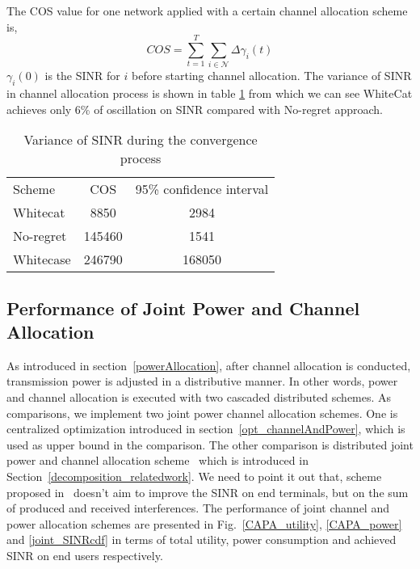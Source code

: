 The COS value for one network applied with a certain channel allocation scheme is,
\begin{equation}
\label{cos}
			COS = \sum\limits_{t=1}^T   \sum\limits_{i\in \mathcal{N}} \varDelta  \gamma_i(t)
			\end{equation}
$\gamma_i(0)$ is the SINR for $i$ before starting channel allocation.
The variance of SINR in channel allocation process is shown in table \ref{costable} from which we can see WhiteCat achieves only 6\% of oscillation on SINR compared with No-regret approach.
\begin{table}[!h]
\centering
\begin{tabular}{|l|c|c|}
  \hline
  Scheme			 						& COS 					& 95\% confidence interval\\
    \hhline{|=|=|=|}
  Whitecat									& 8850					& 2984\\\hline
  No-regret									& 145460				& 1541\\\hline
  Whitecase 								& 246790 				& 168050\\ 
  \hline
\end{tabular}
\caption{Variance of SINR during the convergence process}
\label{costable}
\end{table}



\subsection{Performance of Joint Power and Channel Allocation}
\label{joint}

As introduced in section~\ref{powerAllocation}, after channel allocation is conducted, transmission power is adjusted in a distributive manner.
In other words, power and channel allocation is executed with two cascaded distributed schemes.
As comparisons, we implement two joint power channel allocation schemes.
One is centralized optimization introduced in section~\ref{opt_channelAndPower}, which is used as upper bound in the comparison.
The other comparison is distributed joint power and channel allocation scheme~\cite{pimrc_2012} which is introduced in Section~\ref{decomposition_relatedwork}.
We need to point it out that, scheme proposed in~\cite{pimrc_2012} doesn't aim to improve the SINR on end terminals, but on the sum of produced and received interferences.
The performance of joint channel and power allocation schemes are presented in Fig.~\ref{CAPA_utility}, \ref{CAPA_power} and \ref{joint_SINRcdf} in terms of total utility, power consumption and achieved SINR on end users respectively.


